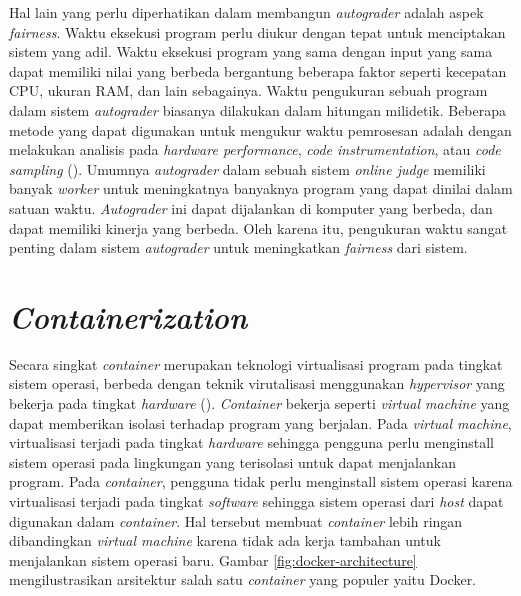 \par Hal lain yang perlu diperhatikan dalam membangun \textit{autograder} adalah aspek \textit{fairness}. Waktu eksekusi program perlu diukur dengan tepat untuk menciptakan sistem yang adil. Waktu eksekusi program yang sama dengan input yang sama dapat memiliki nilai yang berbeda bergantung beberapa faktor seperti kecepatan CPU, ukuran RAM, dan lain sebagainya. Waktu pengukuran sebuah program dalam sistem \textit{autograder} biasanya dilakukan dalam hitungan milidetik. Beberapa metode yang dapat digunakan untuk mengukur waktu pemrosesan adalah dengan melakukan analisis pada \textit{hardware performance}, \textit{code instrumentation}, atau \textit{code sampling} (\cite{wasikojsurvey}). Umumnya \textit{autograder} dalam sebuah sistem \textit{online judge} memiliki banyak \textit{worker} untuk meningkatnya banyaknya program yang dapat dinilai dalam satuan waktu. \textit{Autograder} ini dapat dijalankan di komputer yang berbeda, dan dapat memiliki kinerja yang berbeda. Oleh karena itu, pengukuran waktu sangat penting dalam sistem \textit{autograder} untuk meningkatkan \textit{fairness} dari sistem.

\section{\textit{Containerization}}

\par Secara singkat \textit{container} merupakan teknologi virtualisasi program pada tingkat sistem operasi, berbeda dengan teknik virutalisasi menggunakan \textit{hypervisor} yang bekerja pada tingkat \textit{hardware} (\cite{merkeldocker}). \textit{Container} bekerja seperti \textit{virtual machine} yang dapat memberikan isolasi terhadap program yang berjalan. Pada \textit{virtual machine}, virtualisasi terjadi pada tingkat \textit{hardware} sehingga pengguna perlu menginstall sistem operasi pada lingkungan yang terisolasi untuk dapat menjalankan program. Pada \textit{container}, pengguna tidak perlu menginstall sistem operasi karena virtualisasi terjadi pada tingkat \textit{software} sehingga sistem operasi dari \textit{host} dapat digunakan dalam \textit{container}. Hal tersebut membuat \textit{container} lebih ringan dibandingkan \textit{virtual machine} karena tidak ada kerja tambahan untuk menjalankan sistem operasi baru. Gambar \ref{fig:docker-architecture} mengilustrasikan arsitektur salah satu \textit{container} yang populer yaitu Docker.

